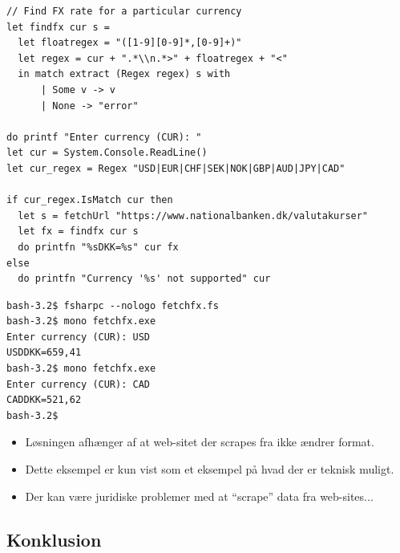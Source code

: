 \documentclass[rgb]{beamer}
\begin{document}
\begin{frame}[fragile]
\begin{footnotesize}

\begin{lstlisting}[numbers=none,frame=none]
// Find FX rate for a particular currency
let findfx cur s =
  let floatregex = "([1-9][0-9]*,[0-9]+)"
  let regex = cur + ".*\\n.*>" + floatregex + "<"
  in match extract (Regex regex) s with
      | Some v -> v
      | None -> "error"

do printf "Enter currency (CUR): "
let cur = System.Console.ReadLine()
let cur_regex = Regex "USD|EUR|CHF|SEK|NOK|GBP|AUD|JPY|CAD"

if cur_regex.IsMatch cur then
  let s = fetchUrl "https://www.nationalbanken.dk/valutakurser"
  let fx = findfx cur s
  do printfn "%sDKK=%s" cur fx
else
  do printfn "Currency '%s' not supported" cur
\end{lstlisting}

\end{footnotesize}
\end{frame}

\begin{frame}[fragile]
\begin{footnotesize}

\begin{verbatim}
bash-3.2$ fsharpc --nologo fetchfx.fs
bash-3.2$ mono fetchfx.exe
Enter currency (CUR): USD
USDDKK=659,41
bash-3.2$ mono fetchfx.exe
Enter currency (CUR): CAD
CADDKK=521,62
bash-3.2$
\end{verbatim}

\vspace{1ex}

\begin{itemize}
\item Løsningen afhænger af at web-sitet der scrapes fra ikke ændrer format.
\item Dette eksempel er kun vist som et eksempel på hvad der er
  teknisk muligt.
\item Der kan være juridiske problemer med at ``scrape'' data fra web-sites...
\end{itemize}
\end{footnotesize}
\end{frame}

\subsection*{Konklusion}
\begin{frame}[fragile]

  \vspace{3mm}
  \tableofcontents
\end{frame}
\end{document}
